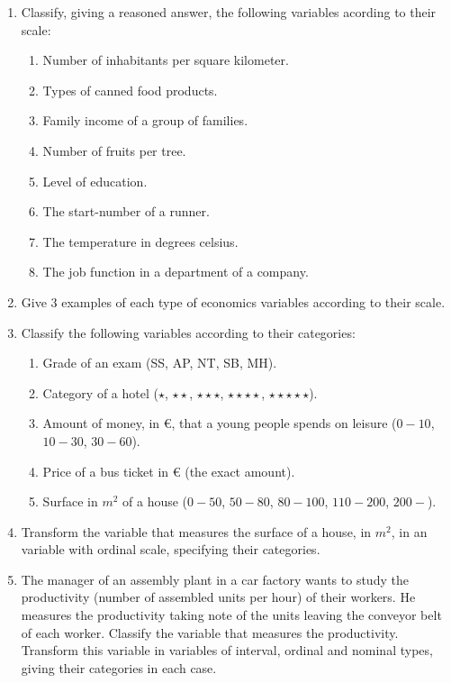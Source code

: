 \begin{enumerate}[leftmargin=*]
\item Classify, giving a reasoned answer, the following variables acording to their scale:
\begin{enumerate}
\item Number of inhabitants per square kilometer. 
\item Types of canned food products.
\item Family income of a group of families. 
\item Number of fruits per tree. 
\item Level of education.
\item The start-number of a runner. 
\item The temperature in degrees celsius. 
\item The job function in a department of a company. 
\end{enumerate}

\item Give 3 examples of each type of economics variables according to their scale. 

\item Classify the following variables according to their categories: 
\begin{enumerate}
\item Grade of an exam (SS, AP, NT, SB, MH).
\item Category of a hotel ($\star$, $\star\star$, $\star\star\star$, $\star\star\star\star$, $\star\star\star\star\star$).
\item Amount of money, in €, that a young people spends on leisure ($0-10$, $10-30$, $30-60$).
\item Price of a bus ticket in € (the exact amount).
\item Surface in $m^2$ of a house ($0-50$, $50-80$, $80-100$, $110-200$, $200-$).
\end{enumerate}

\item Transform the variable that measures the surface of a house, in $m^2$, in an variable with ordinal scale,
specifying their categories. 

\item The manager of an assembly plant in a car factory wants to study the productivity (number of assembled units per hour) of
their workers.
He measures the productivity taking note of the units leaving the conveyor belt of each worker. 
Classify the variable that measures the productivity.
Transform this variable in variables of interval, ordinal and nominal types, giving their categories in each case.   

\end{enumerate}